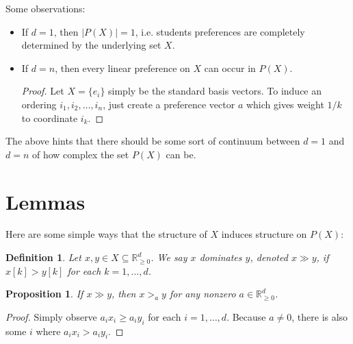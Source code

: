 \documentclass[12pt]{article}
\newtheorem*{definition}{Definition}
\newtheorem{proposition}[theorem]{Proposition}
\newcommand{\Rgz}{\mathbb{R}_{\ge 0}}
\newcommand{\1}[1]{\mathds{1}[{#1}]}
\begin{document}
  Some observations:
  \begin{itemize}
    \item If $d=1$, then $|P(X)| = 1$, i.e. students preferences are completely
      determined by the underlying set $X$.
    \item If $d=n$, then every linear preference on $X$ can occur in $P(X)$.
      \begin{proof}
        Let $X = \{e_i\}$ simply be the standard basis vectors.
        To induce an ordering $i_1, i_2, \ldots, i_n$, just create a preference
        vector $a$ which gives weight $1/k$ to coordinate $i_k$.
      \end{proof}
  \end{itemize}
  The above hints that there should be some sort of continuum between $d=1$
  and $d=n$ of how complex the set $P(X)$ can be.

\section{Lemmas}

  Here are some simple ways that the structure of $X$ induces structure on $P(X)$:

  \begin{definition}
    Let $x,y\in X\subseteq \Rgz^d$.
    We say $x$ \emph{dominates} $y$, denoted $x\gg y$,
    if $x[k] > y[k]$ for each $k=1,\ldots,d$.
  \end{definition}
  \begin{proposition}
    If $x \gg y$, then $x >_a y$ for any nonzero $a\in \Rgz^d$.
  \end{proposition}
  \begin{proof}
    Simply observe $a_i x_i \ge a_i y_i$ for each $i=1,\ldots, d$.
    Because $a\ne 0$, there is also some $i$ where $a_i x_i > a_i y_i$.
  \end{proof}
\end{document}
